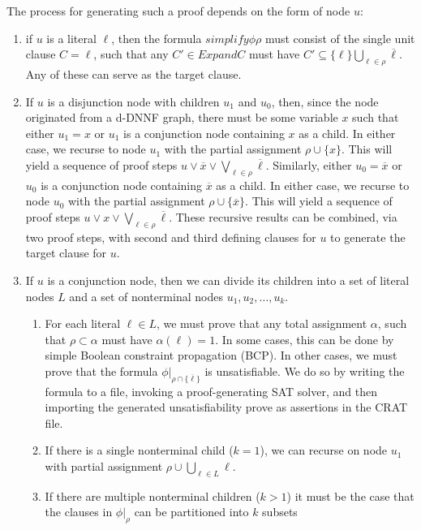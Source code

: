 \documentclass[letterpaper,USenglish,cleveref, autoref, thm-restate]{lipics-v2021}
\newcommand{\obar}[1]{\overline{#1}}
\newcommand{\lit}{\ell}
\newcommand{\passign}{\rho}
\newcommand{\simplify}[2]{#1|_{#2}}
\newcommand{\prov}{\mathit{Expand}}
\begin{document}
The process for generating such a proof depends on the form of node $u$:
\begin{enumerate}
\item if $u$ is a literal $\lit$, then the formula
  $simplify{\phi}{\passign}$ must consist of the single unit clause
  $C = \lit$, such that any $C' \in \prov{C}$ must have $C' \subseteq \{ \lit \} \bigcup_{\lit \in \passign} \obar{\lit}$.
  Any of these can
  serve as the target clause.
\item If $u$ is a disjunction node with children $u_1$ and $u_0$,
  then, since the node originated from a d-DNNF graph, there must be
  some variable $x$ such that either $u_1 = x$ or $u_1$ is a
  conjunction node containing $x$ as a child.  In either case, we
  recurse to node $u_1$ with the partial assignment $\passign \cup \{ x \}$.
  This will yield a sequence of proof steps
  $u \lor \obar{x} \lor \bigvee_{\lit \in \passign} \obar{\lit}$.
Similarly, either $u_0  = \obar{x}$ or $u_0$ is a conjunction node containing $\obar{x}$ as
  a child.  In either case, we recurse to node $u_0$
 with the partial assignment $\passign \cup \{ \obar{x} \}$.
  This will yield a sequence of proof steps
  $u \lor x \lor \bigvee_{\lit \in \passign} \obar{\lit}$.
  These recursive results can be combined, via two proof steps, with second and third defining clauses for $u$
  to generate the target clause for $u$.
\item If $u$ is a conjunction node, then we can divide its children
  into a set of literal nodes $L$ and a set of nonterminal nodes $u_1, u_2, \ldots, u_k$.
  \begin{enumerate}
    \item For each literal 
  $\lit \in L$, we must prove that any total assignment $\alpha$, such that
  $\passign \subset \alpha$ must have $\alpha(\lit) = 1$.  In some
  cases, this can be done by simple Boolean constraint propagation (BCP).
  In other cases, we must prove that the formula
  $\simplify{\phi}{\passign \cap \{\obar{\lit}\}}$ is unsatisfiable.  We
  do so by writing the formula to a file, invoking a proof-generating
  SAT solver, and then importing the generated unsatisfiability prove
  as assertions in the CRAT file.
\item If there is a single nonterminal child ($k = 1$), we can recurse on node $u_1$
  with partial assignment $\passign \cup \bigcup_{\lit \in L} \lit$.
\item If there are multiple nonterminal children ($k > 1$)
  it must be the case that the clauses in
  $\simplify{\phi}{\passign}$ can be partitioned into $k$ subsets

\end{enumerate}
\end{enumerate}
\end{document}
